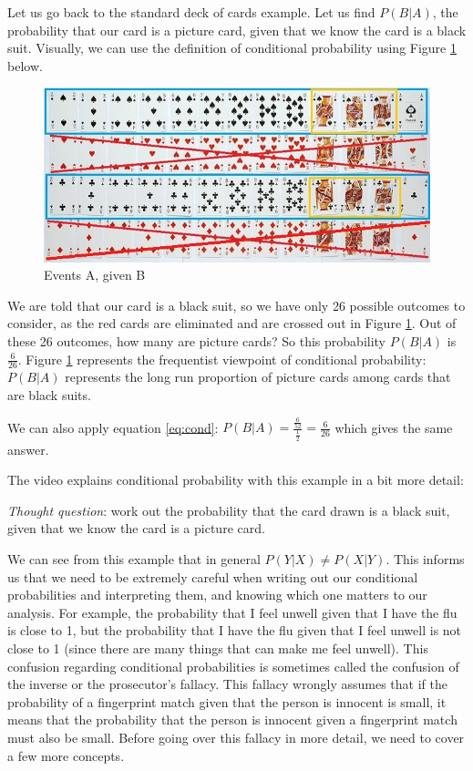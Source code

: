 \documentclass[
]{book}
\begin{document}
Let us go back to the standard deck of cards example. Let us find \(P(B|A)\), the probability that our card is a picture card, given that we know the card is a black suit. Visually, we can use the definition of conditional probability using Figure \ref{fig:cardscond} below.

\begin{figure}
\centering
\includegraphics{images/02-cardscond.jpg}
\caption{\label{fig:cardscond}Events A, given B}
\end{figure}

We are told that our card is a black suit, so we have only 26 possible outcomes to consider, as the red cards are eliminated and are crossed out in Figure \ref{fig:cardscond}. Out of these 26 outcomes, how many are picture cards? So this probability \(P(B|A)\) is \(\frac{6}{26}\). Figure \ref{fig:cardscond} represents the frequentist viewpoint of conditional probability: \(P(B|A)\) represents the long run proportion of picture cards among cards that are black suits.

We can also apply equation \eqref{eq:cond}: \(P(B|A) = \frac{\frac{6}{52}}{\frac{1}{2}} = \frac{6}{26}\) which gives the same answer.

The video explains conditional probability with this example in a bit more detail:

\emph{Thought question}: work out the probability that the card drawn is a black suit, given that we know the card is a picture card.

We can see from this example that in general \(P(Y|X) \neq P(X|Y)\). This informs us that we need to be extremely careful when writing out our conditional probabilities and interpreting them, and knowing which one matters to our analysis. For example, the probability that I feel unwell given that I have the flu is close to 1, but the probability that I have the flu given that I feel unwell is not close to 1 (since there are many things that can make me feel unwell). This confusion regarding conditional probabilities is sometimes called the confusion of the inverse or the prosecutor's fallacy. This fallacy wrongly assumes that if the probability of a fingerprint match given that the person is innocent is small, it means that the probability that the person is innocent given a fingerprint match must also be small. Before going over this fallacy in more detail, we need to cover a few more concepts.
\end{document}
